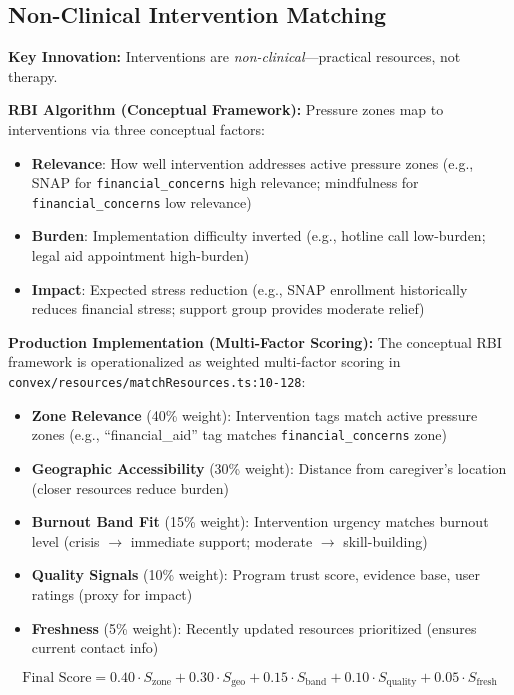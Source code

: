 \documentclass{article}
\begin{document}
%
\subsection{Non{-}Clinical Intervention Matching}%
\label{subsec:Non{-}ClinicalInterventionMatching}%
\textbf{Key Innovation:} Interventions are \textit{non-clinical}—practical resources, not therapy.

\textbf{RBI Algorithm (Conceptual Framework):} Pressure zones map to interventions via three conceptual factors:
\begin{itemize}
    \item \textbf{Relevance}: How well intervention addresses active pressure zones (e.g., SNAP for \texttt{financial\_concerns} high relevance; mindfulness for \texttt{financial\_concerns} low relevance)
    \item \textbf{Burden}: Implementation difficulty inverted (e.g., hotline call low-burden; legal aid appointment high-burden)
    \item \textbf{Impact}: Expected stress reduction (e.g., SNAP enrollment historically reduces financial stress; support group provides moderate relief)
\end{itemize}

\textbf{Production Implementation (Multi-Factor Scoring):} The conceptual RBI framework is operationalized as weighted multi-factor scoring in \texttt{convex/resources/matchResources.ts:10-128}:
\begin{itemize}
    \item \textbf{Zone Relevance} (40\% weight): Intervention tags match active pressure zones (e.g., ``financial\_aid'' tag matches \texttt{financial\_concerns} zone)
    \item \textbf{Geographic Accessibility} (30\% weight): Distance from caregiver's location (closer resources reduce burden)
    \item \textbf{Burnout Band Fit} (15\% weight): Intervention urgency matches burnout level (crisis $\rightarrow$ immediate support; moderate $\rightarrow$ skill-building)
    \item \textbf{Quality Signals} (10\% weight): Program trust score, evidence base, user ratings (proxy for impact)
    \item \textbf{Freshness} (5\% weight): Recently updated resources prioritized (ensures current contact info)
\end{itemize}

$$\text{Final Score} = 0.40 \cdot S_{\text{zone}} + 0.30 \cdot S_{\text{geo}} + 0.15 \cdot S_{\text{band}} + 0.10 \cdot S_{\text{quality}} + 0.05 \cdot S_{\text{fresh}}$$
\end{document}

